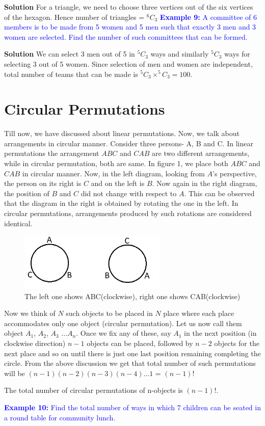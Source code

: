 \documentclass[12pt, a4paper]{article}
\begin{document}
\textbf{Solution} For a triangle, we need to choose three vertices out of the six vertices of the hexagon. Hence number of triangles = $^6C_3$ \newline
\textcolor{blue}{\textbf{Example 9:} A committee of 6 members is to be made from 5 women and 5 men such that exactly 3 men and 3 women are selected. Find the number of such committees that can be formed.}

\textbf{Solution} We can select 3 men out of 5 in $^5C_3$ ways and similarly $^5C_3$ ways for selecting 3 out of 5 women. Since selection of men and women are independent, total number of teams that can be made is $^{5}C_{3} \times ^{5}C_{3} = 100$.
\section{Circular Permutations}
Till now, we have discussed about linear permutations. Now, we talk about arrangements in circular manner. Consider three persons- A, B and C. In linear permutations the arrangement $ABC$ and $CAB$ are two different arrangements, while in circular permutation, both are same. In figure 1, we place both $ABC$ and $CAB$ in circular manner. Now, in the left diagram, looking from $A$'s perspective, the person on its right is $C$ and on the left is $B$. Now again in the right diagram, the position of $B$ and $C$ did not change with respect to $A$. This can be observed that the diagram in the right is obtained by rotating the one in the left. In circular permutations, arrangements produced by such rotations are considered identical.
\begin{figure}
    \centering
    \includegraphics[width=7cm]{images/PnCcircularpermu}
    \caption{The left one shows ABC(clockwise), right one shows CAB(clockwise)}
\end{figure} 
Now we think of $N$ such objects to be placed in $N$ place where each place accommodates only one object (circular permutation). Let us now call them object $A_{1}$, $A_{2}$, $A_3$ ...$A_n$. Once we fix any of these, say $A_1$ in the next position (in clockwise direction) $n-1$ objects can be placed, followed by $n-2$ objects for the next place and so on until there is just one last position remaining completing the circle. From the above discussion we get that total number of such permutations will be $(n-1)(n-2)(n-3)(n-4)$...$1$ = $(n-1)!$ 
\begin{tcolorbox}[colback=ProcessBlue!10!White,colframe=Blue!60!White]
The total number of circular permutations of n-objects is $(n-1)!$.
\end{tcolorbox}
\textcolor{blue}{\textbf{Example 10:} Find the total number of ways in which 7 children can be seated in a round table for community lunch.}
\end{document}
